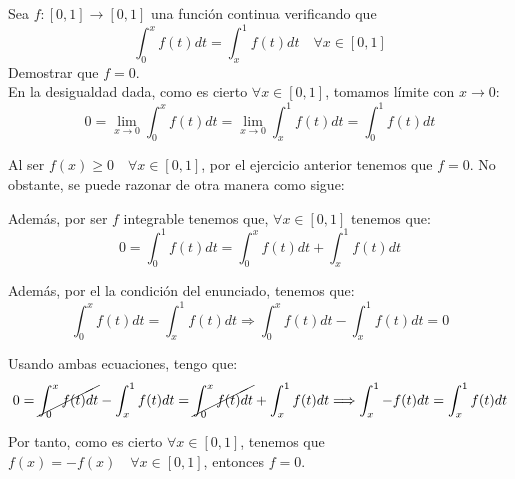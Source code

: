 \begin{ejercicio} Sea $f:[0,1]\to [0,1]$ una función continua verificando que $$\int_0^xf(t)dt = \int_x^1f(t)dt \quad \forall x\in [0,1]$$ Demostrar que $f=0$.\\

    En la desigualdad dada, como es cierto $\forall x\in [0,1]$, tomamos límite con $x\longrightarrow 0$:
    \begin{equation*}
        0=\lim_{x\to 0}\int_0^xf(t)dt = \lim_{x\to 0}\int_x^1f(t)dt = \int_0^1f(t)dt
    \end{equation*}

    Al ser $f(x)\geq 0\quad \forall x\in [0,1]$, por el ejercicio anterior tenemos que $f=0$. No obstante, se puede razonar de otra manera como sigue:

    Además, por ser $f$ integrable tenemos que,  $\forall x\in [0,1]$ tenemos que:
    \begin{equation*}
        0= \int_0^1f(t)dt = \int_0^x f(t)dt+ \int_x^1f(t)dt
    \end{equation*}

    Además, por el la condición del enunciado, tenemos que:
    \begin{equation*}
        \int_0^x f(t)dt = \int_x^1f(t)dt \Longrightarrow
        \int_0^x f(t)dt - \int_x^1f(t)dt = 0
    \end{equation*}

    Usando ambas ecuaciones, tengo que:
    \begin{equation*}
        0=\cancel{\int_0^x f(t)dt} - \int_x^1f(t)dt = \cancel{\int_0^x f(t)dt}+ \int_x^1f(t)dt
        \Longrightarrow \int_x^1 -f(t)dt = \int_x^1f(t)dt
    \end{equation*}

    Por tanto, como es cierto $\forall x\in [0,1]$, tenemos que $f(x)=-f(x)\quad \forall x\in [0,1]$, entonces $ f=0$.
\end{ejercicio}

